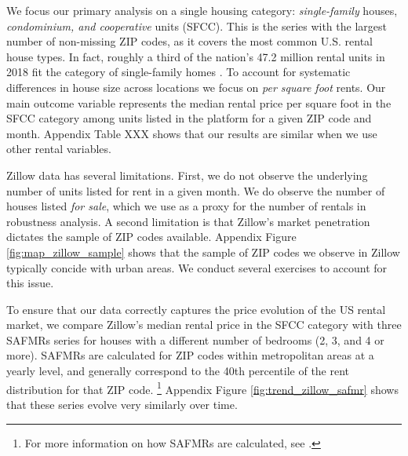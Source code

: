 We focus our primary analysis on a single housing category:
\textit{single-family} houses, \textit{condominium, and cooperative} units (SFCC).
This is the series with the largest number of non-missing ZIP codes, as it 
covers the most common U.S. rental house types.
In fact, roughly a third of the nation's 47.2 million rental units in 2018 fit 
the category of single-family homes \parencite{Fernald2020}.
%
%
%
To account for systematic differences in house size across locations we focus 
on \textit{per square foot} rents.
Our main outcome variable represents the median rental price per square foot in 
the SFCC category among units listed in the platform for a given ZIP code and 
month.
Appendix Table XXX shows that our results are similar when we use other rental 
variables.
%
%

Zillow data has several limitations.
First, we do not observe the underlying number of units listed for rent in a 
given month.
We do observe the number of houses listed \textit{for sale}, which we use as a
proxy for the number of rentals in robustness analysis.
A second limitation is that Zillow's market penetration dictates the sample of 
ZIP codes available.
Appendix Figure \ref{fig:map_zillow_sample} shows that the sample of ZIP codes
we observe in Zillow typically concide with urban areas.
%
% 
%
We conduct several exercises to account for this issue.

To ensure that our data correctly captures the price evolution of the US rental 
market, we compare 
Zillow's median rental price in the SFCC category with 
three SAFMRs series for houses with a different number of bedrooms (2, 3, and 
4 or more).
SAFMRs are calculated for ZIP codes within metropolitan areas at a yearly level, 
and generally correspond to the 40th percentile of the rent distribution for 
that ZIP code.%
\footnote{For more information on how SAFMRs are calculated, see 
\textcite[][page 41641]{hudPreamble}.}
Appendix Figure \ref{fig:trend_zillow_safmr} shows that these series evolve
very similarly over time.

